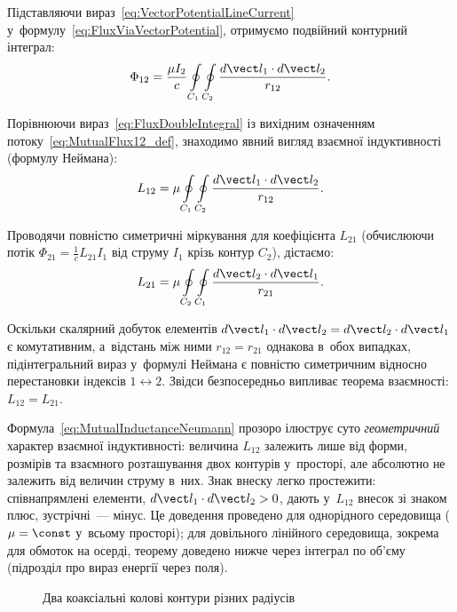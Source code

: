 Підставляючи вираз~\eqref{eq:VectorPotentialLineCurrent}
у~формулу~\eqref{eq:FluxViaVectorPotential}, отримуємо подвійний контурний інтеграл:
\begin{equation}\label{eq:FluxDoubleIntegral}
	\Phi_{12} = \frac{\mu I_2}{c}\oint\limits_{C_1}\oint\limits_{C_2}\frac{d\vect l_1\cdot d\vect l_2}{r_{12}}.
\end{equation}

Порівнюючи вираз~\eqref{eq:FluxDoubleIntegral} із вихідним означенням
потоку~\eqref{eq:MutualFlux12_def}, знаходимо явний вигляд взаємної індуктивності (формулу
Неймана):
\begin{equation}\label{eq:MutualInductanceNeumann}
	L_{12} = {\mu}\oint\limits_{C_1}\oint\limits_{C_2}\frac{d\vect l_1\cdot d\vect l_2}{r_{12}}.
\end{equation}

Проводячи повністю симетричні міркування для коефіцієнта $L_{21}$ (обчислюючи потік
$\Phi_{21} = \frac{1}{c}L_{21}I_1$ від струму $I_1$ крізь контур $C_2$), дістаємо:
\begin{equation}\label{eq:MutualInductanceNeumann21}
	L_{21} = {\mu}\oint\limits_{C_2}\oint\limits_{C_1}\frac{d\vect l_2\cdot d\vect l_1}{r_{21}}.
\end{equation}

Оскільки скалярний добуток елементів $d\vect l_1 \cdot d\vect l_2 = d\vect l_2 \cdot
d\vect l_1$ є комутативним, а~відстань між ними $r_{12} = r_{21}$ однакова в~обох
випадках, підінтегральний вираз у~формулі Неймана є повністю симетричним відносно
перестановки індексів $1 \leftrightarrow 2$. Звідси безпосередньо випливає теорема
взаємності: \(	L_{12} = L_{21} \).

Формула~\eqref{eq:MutualInductanceNeumann} прозоро ілюструє суто \emph{геометричний}
характер взаємної індуктивності: величина $L_{12}$ залежить лише від форми, розмірів та
взаємного розташування двох контурів у~просторі, але абсолютно не залежить від величин
струму в~них. Знак внеску легко простежити: співнапрямлені елементи, $d\vect l_1\cdot d\vect l_2>0$, дають у~$L_{12}$ внесок зі знаком плюс, зустрічні~--- мінус. Це доведення проведено для однорідного середовища ($\mu=\const$ у~всьому просторі); для довільного лінійного середовища, зокрема для обмоток на осерді, теорему доведено нижче через інтеграл по об'єму (підрозділ про вираз енергії через поля).

\begin{figure}[tbp]\centering
	\caption{Два коаксіальні колові контури різних радіусів\label{pic:CoaxialLoops}}
\end{figure}

